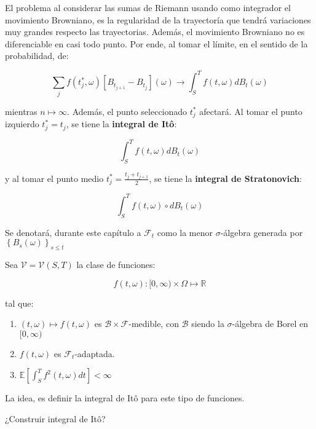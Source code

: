 El problema al considerar las sumas de Riemann usando como integrador el movimiento Browniano, es la regularidad de la trayectoría que tendrá variaciones muy grandes respecto  las trayectorias. Además, el movimiento Browniano no es diferenciable en casi todo punto. Por ende, al tomar el límite, en el sentido de la probabilidad, de:

\[
	\sum_{j} f(t_j^*, \omega) [B_{t_{j+1}} - B_{t_j}](\omega) \rightarrow \int_S^T f(t, \omega) dB_t (\omega) 
\]

mientras $n \mapsto \infty$. Además, el punto seleccionado $t_j^*$ afectará. Al tomar el punto izquierdo $t_j^* =t_j$, se tiene la \textbf{integral de Itô}:

\[
	\int_S^T f(t, \omega) dB_t (\omega) 
\]

y al tomar el punto medio $t_j^* = \frac{t_j + t_{j + 1}}{2}$, se tiene la \textbf{integral de Stratonovich}:

\[
	\int_S^T f(t, \omega) \circ dB_t (\omega) 
\]

Se denotará, durante este capítulo a $\mathcal{F}_t$ como la menor $\sigma$-álgebra generada por $\left\{ B_s (\omega) \right\}_{s \leq t}$


\begin{boxDef}
	Sea $\mathcal{V} = \mathcal{V}(S,T)$ la clase de funciones:

	\[
		f(t, \omega): [0, \infty) \times \Omega \mapsto \mathbb{R}	
	\]

	tal que:

	\begin{enumerate}
		\item $(t, \omega) \mapsto f(t, \omega)$ es $\mathcal{B} \times \mathcal{F}$-medible, con $\mathcal{B}$ siendo la $\sigma$-álgebra de Borel en $[0, \infty)$
		\item $f(t, \omega)$ es $\mathcal{F}_t$-adaptada.
		\item $\mathbb{E}\left[ \int_S^T f^2 (t,\omega) dt \right] < \infty$ 
	\end{enumerate}

\end{boxDef}

La idea, es definir la integral de Itô para este tipo de funciones.

¿Construir integral de Itô?



